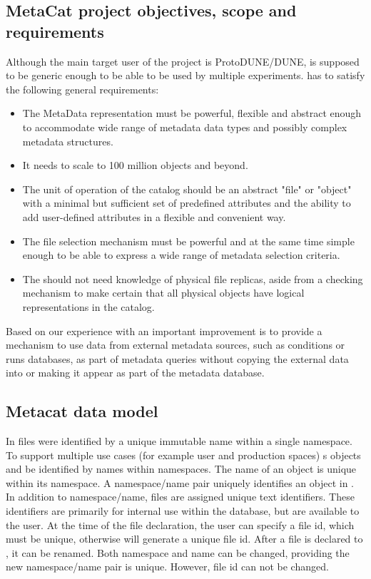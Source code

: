 \documentclass[../main-v1.tex]{subfiles}
\begin{document}
\subsection{MetaCat project objectives, scope and requirements}
Although the main target user of the project is ProtoDUNE/DUNE,  is supposed to be generic enough to be able to be used by multiple experiments.    has to satisfy the following general requirements: 

\begin{itemize} 
\item 
The MetaData representation must be powerful, flexible and abstract enough to accommodate wide range of metadata data types and possibly complex metadata structures. 

\item
It needs to scale to 100 million objects and beyond. 

\item
The unit of operation of the catalog should be an abstract "file" or "object" with a  minimal but sufficient set of predefined   attributes and the ability to add user-defined   attributes in a flexible and convenient way. 

\item 
The file selection mechanism must be powerful and at the same time simple enough to be able to express a wide range of metadata selection criteria. 

\item 
The  should not need knowledge of physical file replicas, aside from a checking mechanism to make certain that all physical objects have logical representations in the catalog. 

\end{itemize} 
 

Based on our experience with  an important improvement is to provide a mechanism to use data from external metadata sources, such as conditions or runs databases, as part of metadata queries without copying the external data into or making it appear as part of the metadata database. 

\subsection{ Metacat data model }
In  files were identified by a unique immutable name within a single namespace.  To support  multiple use cases (for example user and production spaces) s objects and be identified  by names within namespaces. The name of an object is unique within its namespace. A namespace/name pair uniquely identifies  an object in . In addition to namespace/name, files are assigned unique text identifiers. These identifiers are primarily for internal use within the  database, but are available to the user. At the time of the file declaration, the user can specify a file id, which must be unique, otherwise  will generate a unique file id. After a file is declared to , it can be renamed. Both namespace and name can be changed, providing the new namespace/name pair is unique. However, file id can not be changed. 
\end{document}
